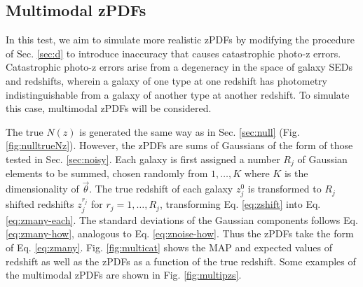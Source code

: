 \documentclass[preprint]{aastex}
\begin{document}
%
%
%

\clearpage
\subsection{Multimodal zPDFs}
\label{sec:multi}

In this test, we aim to simulate more realistic zPDFs by modifying the procedure of Sec. \ref{sec:d} to introduce inaccuracy that causes catastrophic photo-z errors.  Catastrophic photo-z errors arise from a degeneracy in the space of galaxy SEDs and redshifts, wherein a galaxy of one type at one redshift has photometry indistinguishable from a galaxy of another type at another redshift.  To simulate this case, multimodal zPDFs will be considered.

The true $N(z)$ is generated the same way as in Sec. \ref{sec:null} (Fig. \ref{fig:nulltrueNz}).  However, the zPDFs are sums of Gaussians of the form of those tested in Sec. \ref{sec:noisy}.  Each galaxy is first assigned a number $R_{j}$ of Gaussian elements to be summed, chosen randomly from $1,\dots,K$ where $K$ is the dimensionality of $\vec{\theta}$.  The true redshift of each galaxy $z_{j}^{0}$ is transformed to $R_{j}$ shifted redshifts $z^{r_{j}}_{j}$ for $r_{j}=1,\dots,R_{j}$, transforming Eq. \ref{eq:zshift} into Eq. \ref{eq:zmany-each}.  The standard deviations of the Gaussian components follows Eq. \ref{eq:zmany-how}, analogous to Eq. \ref{eq:znoise-how}.  Thus the zPDFs take the form of Eq. \ref{eq:zmany}.  Fig. \ref{fig:multicat} shows the MAP and expected values of redshift as well as the zPDFs as a function of the true redshift.  Some examples of the multimodal zPDFs are shown in Fig. \ref{fig:multipzs}.
\end{document}
